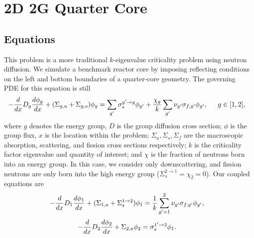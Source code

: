 \section{2D 2G Quarter Core}
\subsection{Equations}
This problem is a more traditional $k$-eigenvalue criticality problem using neutron diffusion.  We simulate a benchmark reactor core by imposing reflecting conditions on the left and bottom boundaries of a quarter-core geometry.  The governing PDE for this equation is still
\begin{equation}
-\frac{d }{d x}D_g\frac{d \phi_g}{d x}+(\Sigma_{g,a}+\Sigma_{g,s})\phi_g = \sum_{g'}\sigma_{s}^{g'\to g}\phi_{g'} + \frac{\chi_{g}}{k}\sum_{g'}\nu_{g'}\sigma_{f,g'}\phi_{g'},\hspace{15pt} g\in[1,2],
\end{equation}
where $g$ denotes the energy group, $D$ is the group diffusion cross section; $\phi$ is the group flux, $x$ is the location within the problem; $\Sigma_a,\Sigma_s,\Sigma_f$ are the macroscopic absorption, scattering, and fission cross sections respectively; $k$ is the criticality factor eigenvalue and quantity of interest; and $\chi$ is the fraction of neutrons born into an energy group.  In this case, we consider only downscattering, and fission neutrons are only born into the high energy group ($\Sigma_s^{2\to1}=\chi_2=0$).  Our coupled equations are
\begin{equation}
-\frac{d }{d x}D_1\frac{d \phi_1}{d x}+(\Sigma_{1,a}+\Sigma_s^{1\to2})\phi_1 = \frac{1}{k}\sum_{g'=1}^2\nu_{g'}\sigma_{f,g'}\phi_{g'},
\end{equation}
\begin{equation}
-\frac{d }{d x}D_2\frac{d \phi_2}{d x}+\Sigma_{2,a}\phi_2 = \sigma_{s}^{1'\to 2}\phi_1.
\end{equation}


